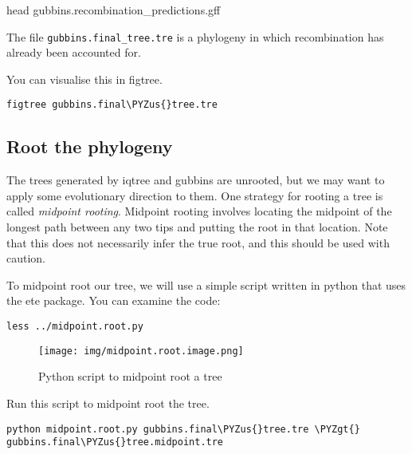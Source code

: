 \documentclass[11pt]{article}
\makeatletter
\def\PYZus{\char`\_}
\def\PYZgt{\char`\>}
\newcommand{\boxspacing}{\kern\kvtcb@left@rule\kern\kvtcb@boxsep}
\newcommand{\prompt}[4]{
        {
        \ttfamily\llap{{\color{blue}\LARGE\faKeyboardO\hspace{3pt}#4}}\vspace{-\baselineskip}
	}
    }
\makeatother
\begin{document}
    head gubbins.recombination\_predictions.gff

    The file \texttt{gubbins.final\_tree.tre} is a phylogeny in which
recombination has already been accounted for.

You can visualise this in figtree.

    \begin{tcolorbox}[breakable, size=fbox, boxrule=1pt, pad at break*=1mm,colback=cellbackground, colframe=cellborder]
\prompt{In}{incolor}{ }{\boxspacing}
\begin{Verbatim}[commandchars=\\\{\}]
figtree gubbins.final\PYZus{}tree.tre
\end{Verbatim}
\end{tcolorbox}

    \hypertarget{root-the-phylogeny}{%
\subsection{Root the phylogeny}\label{root-the-phylogeny}}

The trees generated by iqtree and gubbins are unrooted, but we may want
to apply some evolutionary direction to them. One strategy for rooting a
tree is called \textit{midpoint rooting}. Midpoint rooting involves
locating the midpoint of the longest path between any two tips and
putting the root in that location. Note that this does not necessarily
infer the true root, and this should be used with caution.

To midpoint root our tree, we will use a simple script written in python
that uses the ete package. You can examine the code:

    \begin{tcolorbox}[breakable, size=fbox, boxrule=1pt, pad at break*=1mm,colback=cellbackground, colframe=cellborder]
\prompt{In}{incolor}{ }{\boxspacing}
\begin{Verbatim}[commandchars=\\\{\}]
less ../midpoint.root.py
\end{Verbatim}
\end{tcolorbox}

    \begin{figure}
\centering
\texttt{[image: img/midpoint.root.image.png]}
\caption{Python script to midpoint root a tree}
\end{figure}

    Run this script to midpoint root the tree.

    \begin{tcolorbox}[breakable, size=fbox, boxrule=1pt, pad at break*=1mm,colback=cellbackground, colframe=cellborder]
\prompt{In}{incolor}{ }{\boxspacing}
\begin{Verbatim}[commandchars=\\\{\}]
python midpoint.root.py gubbins.final\PYZus{}tree.tre \PYZgt{} gubbins.final\PYZus{}tree.midpoint.tre
\end{Verbatim}
\end{tcolorbox}
\end{document}

